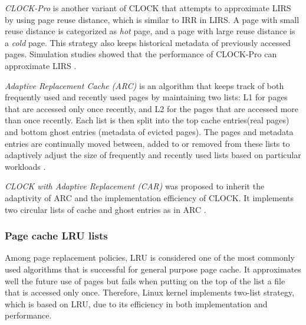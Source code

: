 \textit{CLOCK-Pro} is another variant of CLOCK that attempts to approximate 
LIRS by using page reuse distance, which is similar to IRR in LIRS. 
A page with small reuse distance is categorized as \textit{hot} page, 
and a page with large reuse distance is a \textit{cold} page. This strategy also 
keeps historical metadata of previously accessed pages. 
Simulation studies showed that the performance of CLOCK-Pro can 
approximate LIRS \cite{chavan2011comparison}. 

\textit{Adaptive Replacement Cache (ARC)} is an algorithm that keeps track of
both frequently used and recently used pages by maintaining two lists: 
L1 for pages that are accessed only once recently, and L2 for the pages 
that are accessed more than once recently. 
Each list is then split into the top cache entries(real pages) and bottom 
ghost entries (metadata of evicted pages). 
The pages and metadata entries are continually moved between, 
added to or removed from these lists to adaptively adjust the size 
of frequently and recently used lists based on particular workloads  
\cite{chavan2011comparison}. 

\textit{CLOCK with Adaptive Replacement (CAR)} was proposed to inherit 
the adaptivity of ARC and the implementation efficiency of CLOCK.  
It implements two circular lists of cache and ghost entries as in ARC 
\cite{chavan2011comparison}. 

\subsubsection{Page cache LRU lists}

Among page replacement policies, LRU is considered one of the most commonly 
used algorithms that is successful for general purpose page cache. 
It approximates well the future use of pages but fails when putting on the 
top of the list a file that is accessed only once. 
Therefore, Linux kernel implements two-list strategy, which is based on LRU, 
due to its efficiency in both implementation and performance. 

